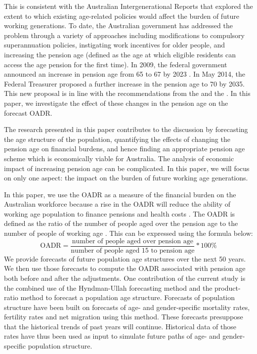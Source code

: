 \documentclass[11pt,a4paper,]{article}
\begin{document}
This is consistent with the Australian Intergenerational Reports \autocite{IGR02,IGR07,Swan2010} that explored the extent to which existing age-related policies would affect the burden of future working generations. To date, the Australian government has addressed the problem through a variety of approaches including modifications to compulsory superannuation policies, instigating work incentives for older people, and increasing the pension age (defined as the age at which eligible residents can access the age pension for the first time). In 2009, the federal government announced an increase in pension age from 65 to 67 by 2023 \autocite{Nielson2010}. In May 2014, the Federal Treasurer proposed a further increase in the pension age to 70 by 2035. This new proposal is in line with the recommendations from the \textcite{PC13} and the \textcite{NCOA2014}. In this paper, we investigate the effect of these changes in the pension age on the forecast OADR.

The research presented in this paper contributes to the discussion by forecasting the age structure of the population, quantifying the effects of changing the pension age on financial burdens, and hence finding an appropriate pension age scheme which is economically viable for Australia. The analysis of economic impact of increasing pension age can be complicated. In this paper, we will focus on only one aspect: the impact on the burden of future working age generations.

In this paper, we use the OADR as a measure of the financial burden on the Australian workforce because a rise in the OADR will reduce the ability of working age population to finance pensions and health costs \autocite{ARW07,IGR02,IGR07}. The OADR is defined as the ratio of the number of people aged over the pension age to the number of people of working age \autocite{ARW07}. This can be expressed using the formula below:
\begin{equation}
  \text{OADR} = \frac{\text{number of people aged over pension age}}{\text{number of people aged 15 to pension age}}*100\%
\end{equation}
We provide forecasts of future population age structures over the next 50 years. We then use those forecasts to compute the OADR associated with pension age both before and after the adjustments. One contribution of the current study is the combined use of the Hyndman-Ullah forecasting method \autocite{HU07} and the product-ratio method \autocite{HBY13} to forecast a population age structure. Forecasts of population structure have been built on forecasts of age- and gender-specific mortality rates, fertility rates and net migration using this method. These forecasts presuppose that the historical trends of past years will continue. Historical data of those rates have thus been used as input to simulate future paths of age- and gender-specific population structure.
\end{document}
